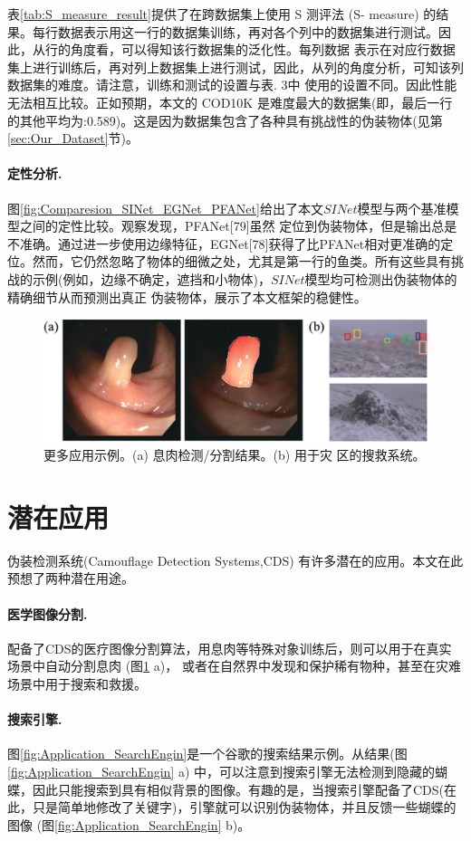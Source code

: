 \documentclass[final]{cvpr}
\newcommand{\mypara}[1]{\paragraph{#1.}}
\renewcommand{\figref}[1]{图\ref{#1}}
\renewcommand{\tabref}[1]{表\ref{#1}}
\renewcommand{\secref}[1]{第\ref{#1}节}
\begin{document}
\tabref{tab:S_measure_result}提供了在跨数据集上使用 S 测评法 (S-
measure) 的结果。每行数据表示用这一行的数据集训练，再对各个列中的数据集进行测试。因此，从行的角度看，可以得知该行数据集的泛化性。每列数据 表示在对应行数据集上进行训练后，再对列上数据集上进行测试，因此，从列的角度分析，可知该列数据集的难度。请注意，训练和测试的设置与表. 3中 使用的设置不同。因此性能无法相互比较。正如预期，本文的 COD10K 是难度最大的数据集(即，最后一行的其他平均为:0.589)。这是因为数据集包含了各种具有挑战性的伪装物体(见\secref{sec:Our_Dataset})。
\mypara{定性分析}\figref{fig:Comparesion_SINet_EGNet_PFANet}给出了本文$SINet$模型与两个基准模型之间的定性比较。观察发现，PFANet[79]虽然 定位到伪装物体，但是输出总是不准确。通过进一步使用边缘特征，EGNet[78]获得了比PFANet相对更准确的定位。然而，它仍然忽略了物体的细微之处，尤其是第一行的鱼类。所有这些具有挑战的示例(例如，边缘不确定，遮挡和小物体)，$SINet$模型均可检测出伪装物体的精确细节从而预测出真正 伪装物体，展示了本文框架的稳健性。

\begin{figure}[tp]
    \centering
    \includegraphics[width=\columnwidth]{COD_Zh_translate/figures/More_Application.png}\small
    \caption{更多应用示例。(a) 息肉检测/分割结果。(b) 用于灾 区的搜救系统。}
    \label{fig:More_Application}
\end{figure}

\section{潜在应用}\label{sec:Application_to_be_found}
伪装检测系统(Camouflage Detection Systems,CDS)
有许多潜在的应用。本文在此预想了两种潜在用途。
\mypara{医学图像分割}配备了CDS的医疗图像分割算法，用息肉等特殊对象训练后，则可以用于在真实场景中自动分割息肉
(\figref{fig:More_Application} a)，
或者在自然界中发现和保护稀有物种，甚至在灾难场景中用于搜索和救援。 
\mypara{搜索引擎}\figref{fig:Application_SearchEngin}是一个谷歌的搜索结果示例。从结果(\figref{fig:Application_SearchEngin} a) 中，可以注意到搜索引擎无法检测到隐藏的蝴蝶，因此只能搜索到具有相似背景的图像。有趣的是，当搜索引擎配备了CDS(在此，只是简单地修改了关键字)，引擎就可以识别伪装物体，并且反馈一些蝴蝶的图像
(\figref{fig:Application_SearchEngin} b)。
\\
\\
\\
\\
\\
\\
\\
\\
\\
\\
\\
\\
\\
\end{document}
